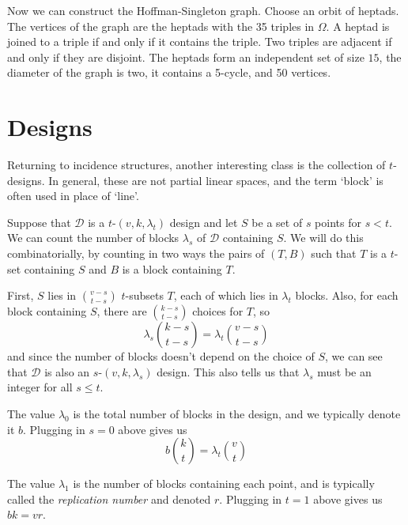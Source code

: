 Now we can construct the Hoffman-Singleton graph.  Choose an orbit of heptads.  The vertices of the graph are the heptads with the 35 triples in $\Omega$.  A heptad is joined to a triple if and only if it contains the triple.  Two triples are adjacent if and only if they are disjoint.  The heptads form an independent set of size $15$, the diameter of the graph is two, it contains a 5-cycle, and 50 vertices.



\section*{Designs}

Returning to incidence structures, another interesting class is the collection of $t$-designs.  In general, these are not partial linear spaces, and the term `block' is often used in place of `line'.


Suppose that $\mathcal{D}$ is a $t$-$(v,k,\lambda_t)$ design and let $S$ be a set of $s$ points for $s<t$.  We can count the number of blocks $\lambda_s$ of $\mathcal{D}$ containing $S$.  We will do this combinatorially, by counting in two ways the pairs of $(T,B)$ such that $T$ is a $t$-set containing $S$ and $B$ is a block containing $T$.

First, $S$ lies in $\binom{v-s}{t-s}$ $t$-subsets $T$, each of which lies in $\lambda_t$ blocks.  Also, for each block containing $S$, there are $\binom{k-s}{t-s}$ choices for $T$, so 
$$\lambda_s\binom{k-s}{t-s} = \lambda_t\binom{v-s}{t-s}$$
and since the number of blocks doesn't depend on the choice of $S$, we can see that $\mathcal{D}$ is also an $s$-$(v,k,\lambda_s)$ design.  This also tells us that $\lambda_s$ must be an integer for all $s\leq t$.

The value $\lambda_0$ is the total number of blocks in the design, and we typically denote it $b$.  Plugging in $s=0$ above gives us
$$b\binom{k}{t}=\lambda_t\binom{v}{t}$$

The value $\lambda_1$ is the number of blocks containing each point, and is typically called the \textit{replication number} and denoted $r$.  Plugging in $t=1$ above gives us $bk=vr$.

